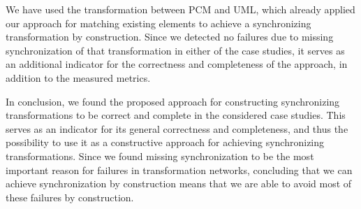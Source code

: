 We have used the transformation between \gls{PCM} and \gls{UML}, which already applied our approach for matching existing elements to achieve a synchronizing transformation by construction.
Since we detected no failures due to missing synchronization of that transformation in either of the case studies, it serves as an additional indicator for the correctness and completeness of the approach, in addition to the measured metrics.

In conclusion, we found the proposed approach for constructing synchronizing transformations to be correct and complete in the considered case studies.
This serves as an indicator for its general correctness and completeness, and thus the possibility to use it as a constructive approach for achieving synchronizing transformations.
Since we found missing synchronization to be the most important reason for failures in transformation networks, concluding that we can achieve synchronization by construction means that we are able to avoid most of these failures by construction.




